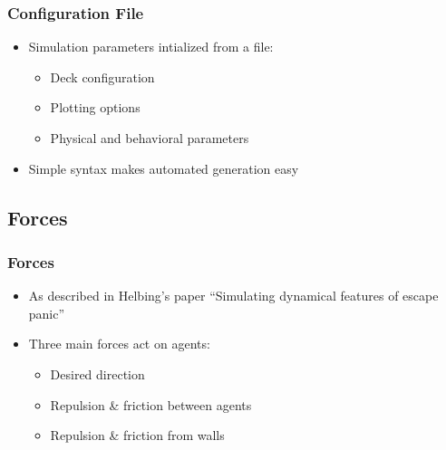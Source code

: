 \documentclass{beamer}
\begin{document}
\begin{frame}
	\frametitle{Configuration File}
	\begin{itemize}
		\item Simulation parameters intialized from a file:
			\begin{itemize}
				\item Deck configuration
				\item Plotting options
				\item Physical and behavioral parameters
			\end{itemize}
		\item Simple syntax makes automated generation easy
	\end{itemize}
\end{frame}

\subsection{Forces}
\begin{frame}
	\frametitle{Forces}
	\begin{itemize}
		\item As described in Helbing's paper ``Simulating dynamical features
		      of escape panic''
		\item Three main forces act on agents:
			\begin{itemize}
				\item Desired direction
				\item Repulsion \& friction between agents
				\item Repulsion \& friction from walls
			\end{itemize}
	\end{itemize}
\end{frame}

\end{document}
